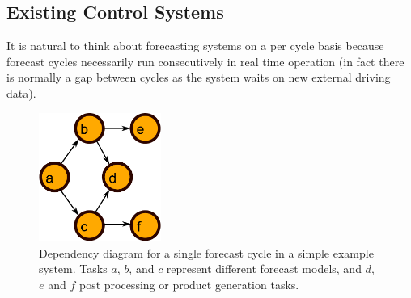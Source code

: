 \documentclass[11pt,a4paper]{article}
\begin{document}
\subsection{Existing Control Systems}

It is natural to think about forecasting systems on a per cycle basis
because forecast cycles necessarily run consecutively in real time
operation (in fact there is normally a gap between cycles as the system
waits on new external driving data). 
\begin{figure}
    \begin{center}
        \includegraphics[width=4cm]{dependencies-one}
    \end{center}
    \caption{\small Dependency diagram for a single forecast cycle
    in a simple example system. Tasks $a$, $b$, and $c$ represent
    different forecast models, and $d$, $e$ and $f$ post processing or
    product generation tasks.}
    \label{fig-dep-one}
\end{figure}
\end{document}
